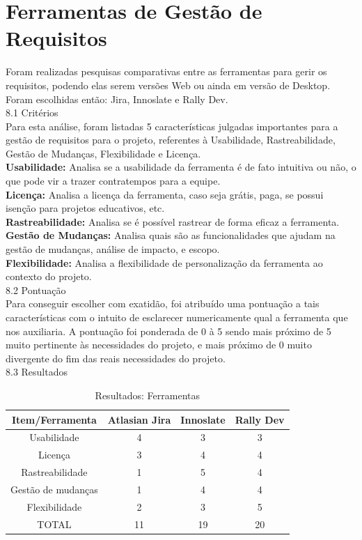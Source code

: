 {{\section{Ferramentas de Gestão de Requisitos}
\label{sec}
\tab Foram realizadas pesquisas comparativas entre as ferramentas para gerir os requisitos, podendo elas serem versões Web ou ainda em versão de Desktop. Foram escolhidas então: Jira, Innoslate e Rally Dev.\\

{\large{8.1 Critérios}}\\

\tab Para esta análise, foram listadas 5 características julgadas importantes para a gestão de requisitos para o projeto, referentes à Usabilidade, Rastreabilidade, Gestão de Mudanças, Flexibilidade e Licença.\\
\tab \textbf{Usabilidade:} Analisa se a usabilidade da ferramenta é de fato intuitiva ou não, o que pode vir a trazer contratempos para a equipe.\\
\tab \textbf{Licença:} Analisa a licença da ferramenta, caso seja grátis, paga, se possui isenção para projetos educativos, etc.\\
\tab \textbf{Rastreabilidade:} Analisa se é possível rastrear de forma eficaz a ferramenta.\\
\tab \textbf{Gestão de Mudanças:} Analisa quais são as funcionalidades que ajudam na gestão de mudanças, análise de impacto, e escopo.\\
\tab \textbf{Flexibilidade:} Analisa a flexibilidade de personalização da ferramenta ao contexto do projeto.\\

{\large{8.2 Pontuação}}\\

\tab Para conseguir escolher com exatidão, foi atribuído uma pontuação a tais características com o intuito de esclarecer numericamente qual a ferramenta que nos auxiliaria. A pontuação foi ponderada de 0 à 5 sendo mais próximo de 5 muito pertinente às necessidades do projeto, e mais próximo de 0 muito divergente do fim das reais necessidades do projeto.\\

{\large{8.3 Resultados}}\\

\begin{longtable}{  c c c c }
\caption{Resultados: Ferramentas}\\
\toprule
Item/Ferramenta & Atlasian Jira  & Innoslate & Rally Dev \\ \midrule
\rowcolor[gray]{0.9}
Usabilidade & 4 & 3 & 3 \\
Licença & 3 & 4 & 4 \\
\rowcolor[gray]{0.9}
Rastreabilidade & 1 & 5 & 4 \\
Gestão de mudanças & 1 & 4 & 4 \\
\rowcolor[gray]{0.9}
Flexibilidade & 2 & 3 & 5  \\
TOTAL & 11 & 19 & 20 \\ \bottomrule


\end{longtable}}}
